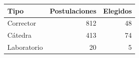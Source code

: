 \begin{tabular}{lrr}
\toprule
\textbf{Tipo} & \textbf{Postulaciones} & \textbf{Elegidos} \\
\midrule
Corrector & 812 & 48 \\
Cátedra & 413 & 74 \\
Laboratorio & 20 & 5 \\
\bottomrule
\end{tabular}
